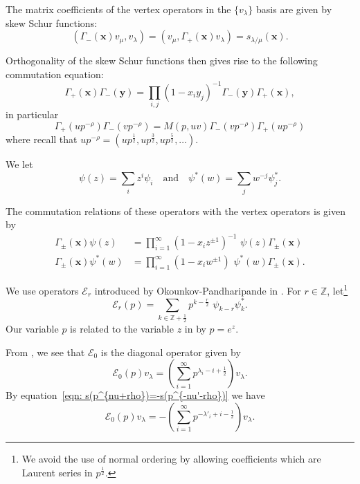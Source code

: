 \documentclass[12pt]{amsart}
\newcommand{\znums} {{\mathbb Z}}		%
\newcommand{\half}{\frac{1}{2}}
\theoremstyle{definition}
\newcommand{\ZplusHalf}{\znums+{ \half}}
\newcommand{\E}{\mathcal{E}}
\newcommand{\ptotheminusrho}{p^{-\rho}}
\begin{document}
The matrix coefficients of the vertex operators in the $\{v_{\lambda}
\}$ basis are given by skew Schur functions:
\begin{equation}\label{eqn: matrix coefs of vertex ops are skew schur}
(\Gamma_{-}(\mathbf{x})v_{\mu},v_{\lambda}) =
(v_{\mu},\Gamma_{+}(\mathbf{x})v_{\lambda}) = s_{\lambda
/\mu}(\mathbf{x}).
\end{equation}

Orthogonality of the skew Schur functions then gives rise to the
following commutation equation:
\[
\Gamma_{+}(\mathbf{x})\Gamma_{-}(\mathbf{y}) = \prod_{i,j}
(1-x_{i}y_{j})^{-1} \Gamma_{-}(\mathbf{y})\Gamma_{+}(\mathbf{x}),
\]
in particular
\begin{equation}\label{eqn: Gamma+Gamma- commutation relation}
\Gamma_{+}(u\ptotheminusrho )\Gamma_{-}(v\ptotheminusrho ) =M(p,uv)
\Gamma_{-}(v\ptotheminusrho )\Gamma_{+}(u\ptotheminusrho )
\end{equation}
where recall that $u\ptotheminusrho  = (up^{\frac{1}{2}},up^{\frac{3}{2}},up^{\frac{5}{2}},\dots )$.

We let
\[
\psi (z) = \sum_{i} z^{i}\psi_{i}\quad \text{and}\quad \psi^{*}(w) =
\sum_{j} w^{-j} \psi_{j}^{*}. 
\]

The commutation relations of these operators with the vertex operators
is given by
\begin{align}\label{eqn: commutation of Gamma(x) with psi(z) and psi*(w)}
\Gamma_{\pm}(\mathbf{x})\psi (z) &= \prod_{i=1}^{\infty}
(1-x_{i}z^{\pm 1})^{-1} \,\, \psi (z)\Gamma_{\pm}(\mathbf{x})\\
\Gamma_{\pm}(\mathbf{x})\psi^{*} (w) &= \prod_{i=1}^{\infty}
(1-x_{i}w^{\pm 1}) \,\,\psi^{*}(w)\Gamma_{\pm}(\mathbf{x}).\nonumber
\end{align}


We use operators $\E_{r}$ introduced by Okounkov-Pandharipande in
\cite[\S~2.2.4]{Okounkov-Pandharipande-completed-cycles}.  For $r\in
\znums$, let\footnote{We avoid the use of normal ordering by allowing
coefficients which are Laurent series in $p^{\half}$.}
\[
\E_{r}(p) = \sum_{k\in \ZplusHalf} p^{k-\frac{r}{2}}\,\, \psi_{k-r}\psi^{*}_{k}.
\]
Our variable $p$ is related to the variable $z$ in
\cite{Okounkov-Pandharipande-completed-cycles} by $p=e^{z}.$


From \cite[Eqns~2.9 and 0.18]{Okounkov-Pandharipande-completed-cycles}, we
see that $\E_{0}$ is the diagonal operator given by
\[
\E _0 (p) v_{\lambda} = \left(\sum_{i=1}^{\infty}
p^{\lambda_{i}-i+\half} \right)v_{\lambda}. 
\]
By equation~\eqref{eqn: s(p^{nu+rho})=-s(p^{-nu'-rho})} we have
\begin{equation}\label{eqn: formula for the operator E0}
\E _0 (p) v_{\lambda} = -\left(\sum_{i=1}^{\infty}
p^{-\lambda'_{i}+i-\half} \right)v_{\lambda}. 
\end{equation}
\end{document}
